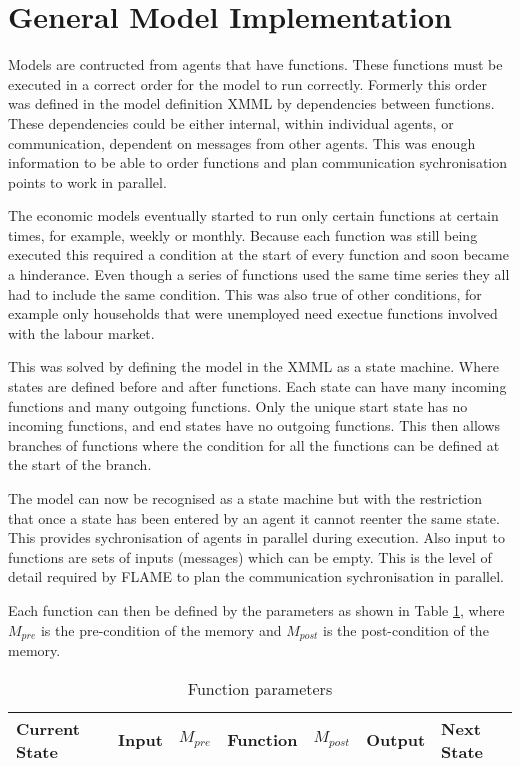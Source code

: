 \section{General Model Implementation}


Models are contructed from agents that have functions. These functions must be
executed in a correct order for the model to run correctly. Formerly this order
was defined in the model definition XMML by dependencies between functions. These
dependencies could be either internal, within individual agents, or
communication, dependent on messages from other agents. This was enough
information to be able to order functions and plan communication sychronisation
points to work in parallel.

The economic models eventually started to run only certain functions at
certain times, for example, weekly or monthly. Because each function
was still being executed this required a condition at the start of every
function and soon became a hinderance. Even though a series of functions used
the same time series they all had to include the same condition. This was also
true of other conditions, for example only households that were unemployed need
exectue functions involved with the labour market.

This was solved by defining the model in the XMML as a state machine. Where
states are defined before and after functions.
Each state can have many incoming functions and many outgoing functions.
Only the unique start state has no incoming functions, and end states have no
outgoing functions. This then allows branches of functions where the condition
for all the functions can be defined at the start of the branch.

The model can now be recognised as a state machine but with the restriction
that once a state has been entered by an agent it cannot reenter the same
state. This provides sychronisation of agents in parallel during execution. Also
input to functions are sets of inputs (messages) which can be empty. This is
the level of detail required by FLAME to plan the communication sychronisation
in parallel.

Each function can then be defined by the parameters as shown in Table
\ref{tab:funcparameters}, where $M_{pre}$ is the pre-condition of the memory
and $M_{post}$ is the post-condition of the memory.

\begin{table}[hbp]
\centering
\begin{tabular}{|l|l|l||l||l|l|l|}
\hline
Current State&Input&$M_{pre}$&Function&$M_{post}$&Output&Next State\\
\hline
\end{tabular}
\caption{Function parameters} \label{tab:funcparameters}
\end{table}

